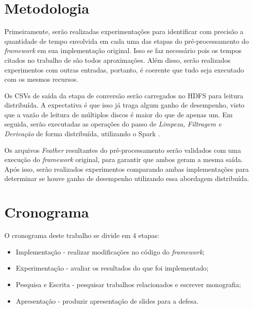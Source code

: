 \documentclass[prop-esp]{iiufrgs}
\begin{document}
%
\chapter{Metodologia}

Primeiramente, serão realizadas experimentações para identificar com precisão a quantidade de tempo
envolvida em cada uma das etapas do pré-processamento do \emph{framework} em sua implementação original. Isso se faz necessário
pois os tempos citados no trabalho de \citet{ref:starvz} são todos aproximações. Além disso, serão realizados experimentos com 
outras entradas, portanto, é coerente que tudo seja executado com os mesmos recursos.

Os CSVs de saída da etapa de conversão serão carregados no HDFS \cite{ref:hdfs} para leitura distribuída. A expectativa é que isso já traga algum ganho de desempenho, visto que a vazão de leitura de múltiplos discos é maior do que de apenas um. Em seguida, serão executadas as operações do passo de \emph{Limpeza, Filtragem e Derivação} de forma distribuída, utilizando o Spark \cite{ref:spark}.

Os arquivos \emph{Feather} resultantes do pré-processamento serão validados com uma execução do \emph{framework} original, para garantir que ambos geram a mesma saída. Após isso, serão realizados experimentos comparando ambas implementações para determinar se houve ganho de desempenho utilizando essa abordagem distribuída.

%
\chapter{Cronograma}

O cronograma deste trabalho se divide em 4 etapas:

\begin{itemize}
    \item Implementação - realizar modificações no código do \emph{framework};
    \item Experimentação - avaliar os resultados do que foi implementado;
    \item Pesquisa e Escrita - pesquisar trabalhos relacionados e escrever monografia;
    \item Apresentação - produzir apresentação de slides para a defesa.
\end{itemize}
\end{document}
